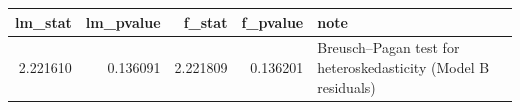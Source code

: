 \begin{tabular}{rrrrl}
\toprule
lm\_stat & lm\_pvalue & f\_stat & f\_pvalue & note \\
\midrule
2.221610 & 0.136091 & 2.221809 & 0.136201 & Breusch–Pagan test for heteroskedasticity (Model B residuals) \\
\bottomrule
\end{tabular}

